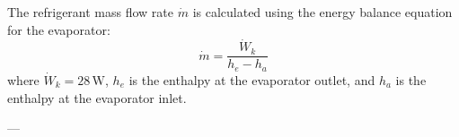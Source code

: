 The refrigerant mass flow rate \( \dot{m} \) is calculated using the energy balance equation for the evaporator:  
\[
\dot{m} = \frac{\dot{W}_k}{h_e - h_a}
\]  
where \( \dot{W}_k = 28 \, \text{W} \), \( h_e \) is the enthalpy at the evaporator outlet, and \( h_a \) is the enthalpy at the evaporator inlet.

---